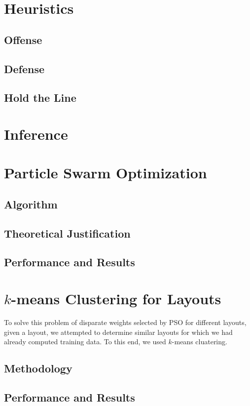 \documentclass[12pt]{article}
\begin{document}
\section{Heuristics}
\subsection{Offense}
\subsection{Defense}
\subsection{Hold the Line}

\section{Inference}

\section{Particle Swarm Optimization}
\subsection{Algorithm}
\subsection{Theoretical Justification}
\subsection{Performance and Results}

\section{$k$-means Clustering for Layouts}
To solve this problem of disparate weights selected by PSO for different
layouts, given a layout, we attempted to determine similar layouts for
which we had already computed training data.  To this end, we used
$k$-means cluatering.
\subsection{Methodology}
\subsection{Performance and Results}
\end{document}
